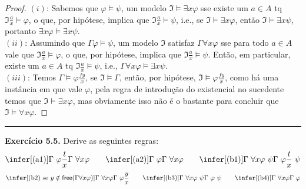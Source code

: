 \documentclass[11pt]{article}
\newcommand{\mf}[1]{\mathfrak{#1}}
\newcommand{\msf}[1]{\mathsf{#1}}
\begin{document}
\begin{proof}
    $(i)$: Sabemos que $\varphi\vDash\psi$, um modelo $\mf{I}\vDash\exists x\varphi$ sse existe um $a\in A$ tq $\mf{I}\frac{a}{x}\vDash\varphi$, o que, por hipótese, implica que $\mf{I}\frac{a}{x}\vDash\psi$, i.e., se $\mf{I}\vDash\exists x\varphi$, então $\mf{I}\vDash\exists x\psi$, portanto $\exists x\varphi\vDash\exists x\psi$.\\
    $(ii)$: Assumindo que $\Gamma\varphi\vDash\psi$, um modelo $\mf{I}$ satisfaz $\Gamma\forall x\varphi$ sse para todo $a\in A$ vale que $\mf{I}\frac{a}{x}\vDash\varphi$, o que, por hipótese, implica que $\mf{I}\frac{a}{x}\vDash\psi$. Então, em particular, existe um $a\in A$ tq $\mf{I}\frac{a}{x}\vDash\psi$, i.e., $\Gamma\forall x\varphi\vDash\exists x\psi$.\\
    $(iii)$: Temos $\Gamma\vDash\varphi\frac{fy}{x}$, se $\mf{I}\vDash\Gamma$, então, por hipótese, $\mf{I}\vDash\varphi\frac{fy}{x}$, como há uma instância em que vale $\varphi$, pela regra de introdução do existencial no sucedente temos que $\mf{I}\vDash\exists x\varphi$, mas obviamente isso não é o bastante para concluir que $\mf{I}\vDash\forall x\varphi$.
\end{proof}

\hrule

\begin{shaded}
\textbf{Exercício 5.5.} Derive as seguintes regras:
$$\infer[(\text{a1})]{\Gamma~\varphi\frac{t}{x}}{\Gamma~\forall x\varphi}~~~~~~\infer[(\text{a2})]{\Gamma~\varphi}{\Gamma~\forall x\varphi}~~~~~~\infer[(\text{b1})]{\Gamma~\forall x\varphi~\psi}{\Gamma~\varphi\frac{t}{x}~\psi}$$
$$\infer[(\text{b2})\text{ se }y\notin\msf{free}(\Gamma\forall x\varphi)]{\Gamma~\forall x\varphi}{\Gamma~\varphi\frac{y}{x}}~~~~~~\infer[(\text{b3})]{\Gamma~\forall x\varphi~\psi}{\Gamma~\varphi~\psi}~~~~~~\infer[(\text{b4})]{\Gamma~\forall x\varphi}{\Gamma~\varphi}$$
\end{shaded}
\end{document}
